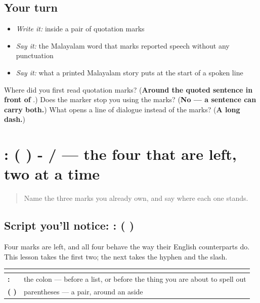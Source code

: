 \subsection*{Your turn}
\begin{itemize}
\raggedright
  \item \emph{Write it:} \textbf{  } inside a pair of quotation marks
  \item \emph{Say it:} the Malayalam word that marks reported speech without any punctuation
  \item \emph{Say it:} what a printed Malayalam story puts at the start of a spoken line
\end{itemize}

\begin{tcolorbox}[breakable,colback=teal!4,colframe=teal!35!black,title={Before you move on}]
Where did you first read quotation marks? (\textbf{Around the quoted sentence in front of }.) Does the marker stop you using the marks? (\textbf{No — a sentence can carry both.}) What opens a line of dialogue instead of the marks? (\textbf{A long dash.})
\end{tcolorbox}
\section[: ( ) - / (colon …)]{: ( ) - / — the four that are left, two at a time}

\label{lesson:ML-W108-the-rest}



\begin{quote}
Name the three marks you already own, and say where each one stands.
\end{quote}

\subsection*{Script you'll notice: : ( )}
Four marks are left, and all four behave the way their English counterparts do. This lesson takes the first two; the next takes the hyphen and the slash.

\noindent
\begin{tabularx}{\linewidth}{@{}>{\raggedright\arraybackslash}X>{\raggedright\arraybackslash}X@{}}
\toprule
\textbf{} & \textbf{} \\
\midrule
\textbf{:} & the colon — before a list, or before the thing you are about to spell out \\
\textbf{( )} & parentheses — a pair, around an aside \\
\bottomrule
\end{tabularx}

